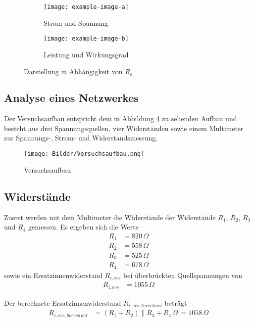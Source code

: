 \begin{figure}[ht]
    \begin{subfigure}[h]{0.4\linewidth}
        \texttt{[image: example-image-a]}
        \caption{Strom und Spannung}
        \label{fig:stromSpannungsKennlinie}
    \end{subfigure}
    \hfill
    \begin{subfigure}[h]{0.4\linewidth}
        \texttt{[image: example-image-b]}
        \caption{Leistung und Wirkungsgrad}
        \label{fig:leistungWirkungsgrad}
    \end{subfigure}
    \caption{Darstellung in Abhängigkeit von $R_a$}
\end{figure}

\subsection{Analyse eines Netzwerkes}
Der Versuchsaufbau entspricht dem in Abbildung \ref{fig:versuchsaufbauNetzwerk} zu sehenden Aufbau und besteht aus drei Spannungsquellen, vier Widerständen sowie einem Multimeter zur Spannungs-, Strom- und Widerstandsmessung.
\begin{figure}[ht]
    \centering
    \texttt{[image: Bilder/Versuchsaufbau.png]}
    \caption{Versuchsaufbau}
    \label{fig:versuchsaufbauNetzwerk}
\end{figure}

\subsection*{Widerstände}
Zuerst werden mit dem Multimeter die Widerstände der Widerstände $R_1$, $R_2$, $R_3$ und $R_4$ gemessen. Es ergeben sich die Werte
\begin{align*}
    R_1 & = 820\,\Omega \\
    R_2 & = 558\,\Omega \\
    R_3 & = 525\,\Omega \\
    R_4 & = 678\,\Omega
\end{align*}
sowie ein Ersatzinnenwiderstand $R_{i,ers}$ bei überbrückten Quellspannungen von
\begin{align*}
    R_{i,ers} & = 1055\,\Omega
\end{align*}

Der berechnete Ersatzinnenwiderstand $R_{i,ers,berechnet}$ beträgt
\begin{align*}
    R_{i,ers,berechnet} & = \left(R_1+R_2\right)\parallel{R_3+R_4}\,\Omega\,
    = 1058\,\Omega
\end{align*}

